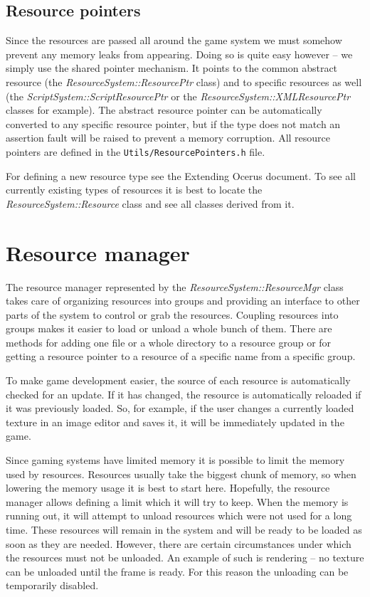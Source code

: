 \documentclass[a4paper, 12pt]{report}
\begin{document}
\subsection{Resource pointers}

Since the resources are passed all around the game system we must somehow prevent any memory leaks from appearing. Doing so is quite easy however -- we simply use the shared pointer mechanism. It points to the common abstract resource (the \emph{ResourceSystem::ResourcePtr} class) and to specific resources as well (the \emph{ScriptSystem::ScriptResourcePtr} or the \emph{ResourceSystem::XMLResourcePtr} classes for example). The abstract resource pointer can be automatically converted to any specific resource pointer, but if the type does not match an assertion fault will be raised to prevent a memory corruption. All resource pointers are defined in the \verb'Utils/ResourcePointers.h' file.

For defining a new resource type see the Extending Ocerus document. To see all currently existing types of resources it is best to locate the \emph{ResourceSystem::Resource} class and see all classes derived from it.

\section{Resource manager}

The resource manager represented by the \emph{ResourceSystem::ResourceMgr} class takes care of organizing resources into groups and providing an interface to other parts of the system to control or grab the resources. Coupling resources into groups makes it easier to load or unload a whole bunch of them. There are methods for adding one file or a whole directory to a resource group or for getting a resource pointer to a resource of a specific name from a specific group.

To make game development easier, the source of each resource is automatically checked for an update. If it has changed, the resource is automatically reloaded if it was previously loaded. So, for example, if the user changes a currently loaded texture in an image editor and saves it, it will be immediately updated in the game.

Since gaming systems have limited memory it is possible to limit the memory used by resources. Resources usually take the biggest chunk of memory, so when lowering the memory usage it is best to start here. Hopefully, the resource manager allows defining a limit which it will try to keep. When the memory is running out, it will attempt to unload resources which were not used for a long time. These resources will remain in the system and will be ready to be loaded as soon as they are needed. However, there are certain circumstances under which the resources must not be unloaded. An example of such is rendering -- no texture can be unloaded until the frame is ready. For this reason the unloading can be temporarily disabled.
\end{document}
